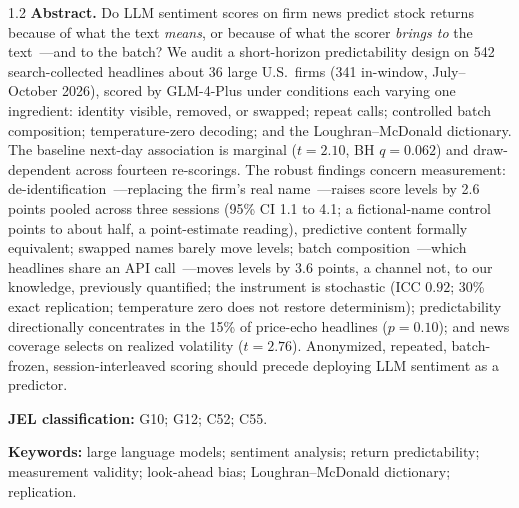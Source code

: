 \vspace{10pt}
\begin{center}
\begin{minipage}{0.88\textwidth}
\small
\begin{spacing}{1.2}
\noindent\textbf{Abstract.} Do LLM sentiment scores on firm news predict stock returns because of what the text \emph{means}, or because of what the scorer \emph{brings to} the text~---and to the batch? We audit a short-horizon predictability design on 542 search-collected headlines about 36 large U.S.\ firms (341 in-window, July--October 2026), scored by GLM-4-Plus under conditions each varying one ingredient: identity visible, removed, or swapped; repeat calls; controlled batch composition; temperature-zero decoding; and the Loughran--McDonald dictionary. The baseline next-day association is marginal ($t=2.10$, BH $q=0.062$) and draw-dependent across fourteen re-scorings. The robust findings concern measurement: de-identification~---replacing the firm's real name~---raises score levels by 2.6 points pooled across three sessions (95\% CI 1.1 to 4.1; a fictional-name control points to about half, a point-estimate reading), predictive content formally equivalent; swapped names barely move levels; batch composition~---which headlines share an API call~---moves levels by 3.6 points, a channel not, to our knowledge, previously quantified; the instrument is stochastic (ICC $0.92$; 30\% exact replication; temperature zero does not restore determinism); predictability directionally concentrates in the 15\% of price-echo headlines ($p=0.10$); and news coverage selects on realized volatility ($t=2.76$). Anonymized, repeated, batch-frozen, session-interleaved scoring should precede deploying LLM sentiment as a predictor.\par
\vspace{6pt}
\noindent\textbf{JEL classification:} G10; G12; C52; C55.\par
\vspace{3pt}
\noindent\textbf{Keywords:} large language models; sentiment analysis; return predictability; measurement validity; look-ahead bias; Loughran--McDonald dictionary; replication.\par
\end{spacing}
\end{minipage}
\end{center}

